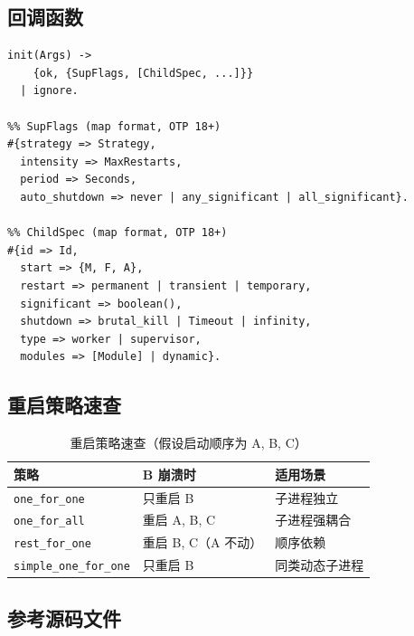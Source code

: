 \documentclass[a4paper,11pt]{article}
\begin{document}
\subsection{回调函数}

\begin{lstlisting}[style=erlangstyle]
%% supervisor callback
init(Args) ->
    {ok, {SupFlags, [ChildSpec, ...]}}
  | ignore.

%% SupFlags (map format, OTP 18+)
#{strategy => Strategy,
  intensity => MaxRestarts,
  period => Seconds,
  auto_shutdown => never | any_significant | all_significant}.

%% ChildSpec (map format, OTP 18+)
#{id => Id,
  start => {M, F, A},
  restart => permanent | transient | temporary,
  significant => boolean(),
  shutdown => brutal_kill | Timeout | infinity,
  type => worker | supervisor,
  modules => [Module] | dynamic}.
\end{lstlisting}

\subsection{重启策略速查}

\begin{table}[H]
\centering
\begin{tabular}{@{}lll@{}}
\toprule
\textbf{策略} & \textbf{B 崩溃时} & \textbf{适用场景} \\
\midrule
\texttt{one\_for\_one} & 只重启 B & 子进程独立 \\
\texttt{one\_for\_all} & 重启 A, B, C & 子进程强耦合 \\
\texttt{rest\_for\_one} & 重启 B, C（A 不动） & 顺序依赖 \\
\texttt{simple\_one\_for\_one} & 只重启 B & 同类动态子进程 \\
\bottomrule
\end{tabular}
\caption{重启策略速查（假设启动顺序为 A, B, C）}
\end{table}

\subsection{参考源码文件}
\end{document}
